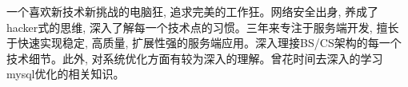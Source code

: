 

\begin{cvparagraph}

  一个喜欢新技术新挑战的电脑狂, 追求完美的工作狂。网络安全出身, 养成了hacker式的思维, 深入了解每一个技术点的习惯。三年来专注于服务端开发, 擅长于快速实现稳定, 高质量, 扩展性强的服务端应用。深入理接BS/CS架构的每一个技术细节。此外, 对系统优化方面有较为深入的理解。曾花时间去深入的学习mysql优化的相关知识。

\end{cvparagraph}
